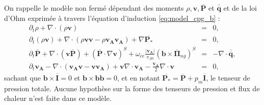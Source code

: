 On rappelle le modèle non fermé dépendant des moments $\rho, \boldsymbol{v}, \overline{\boldsymbol{P}}$ et $\overline{\overline{\boldsymbol{q}}}$ et de la loi d'Ohm  exprimée à travers l'équation d'induction \eqref{eq:model_cpg_b} : 
\begin{eqnarray}
\label{eq:model_cpg_r} \partial_t \rho + \nabla \cdot \left(\rho \boldsymbol{v}\right) &=& 0,\\
\label{eq:model_cpg_v} \partial_t \left(\rho \boldsymbol{v}\right) + \nabla \cdot \left(\rho \boldsymbol{v}\boldsymbol{v} - \rho \boldsymbol{v_A}\boldsymbol{v_A}\right) +  \nabla \overline{\boldsymbol{P_*}}  &=& 0 , \\
\label{eq:model_cpg_P} \partial_t \overline{\boldsymbol{P}} + \nabla \cdot \left( \boldsymbol{v} \overline{\boldsymbol{P}} \right) +  \left(\overline{\boldsymbol{P}} \cdot \nabla \boldsymbol{v}\right)^S + \omega_{ce} \frac{|\boldsymbol{v_A}|}{v_{A0}} \left(\boldsymbol{b}\times \overline{\boldsymbol{\Pi}}_{ng}\right)^S  & =& - \nabla \cdot \overline{\overline{\boldsymbol{q}}} ,\\
\label{eq:model_cpg_b} \partial_t \boldsymbol{v_A} -  \nabla \cdot \left(\boldsymbol{v_A}\boldsymbol{v} - \boldsymbol{v}\boldsymbol{v_A}\right) +  \boldsymbol{v} \nabla \cdot \boldsymbol{v_A} -  \frac{\boldsymbol{v_A}}{2}  \nabla \cdot \boldsymbol{v} &=& 0 ,
\end{eqnarray}
sachant que $\boldsymbol{b}\times \overline{\boldsymbol{I}} = 0$ et $\boldsymbol{b}\times \boldsymbol{b}\boldsymbol{b} = 0$, et en notant $\overline{\boldsymbol{P_*}} = \overline{\boldsymbol{P}} + p_m \overline{\boldsymbol{I}}$, le tenseur de pression totale. Aucune hypothèse sur la forme des tenseurs de pression et flux de chaleur n'est faite dans ce modèle. 

